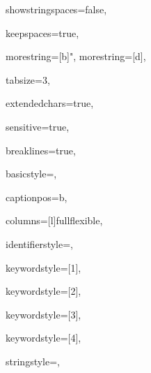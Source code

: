 {%
showstringspaces=false,

keepspaces=true,

morestring=[b]",
morestring=[d],

tabsize=3,

extendedchars=true,

sensitive=true,

breaklines=true,

basicstyle=\ttfamily,

captionpos=b,

columns=[l]fullflexible,


identifierstyle={\ttfamily\color{black}},

keywordstyle=[1]{\ttfamily\color{keywordcolor}},

keywordstyle=[2]{\ttfamily\color{sortcolor}},

keywordstyle=[3]{\ttfamily\color{tacticcolor}},

keywordstyle=[4]{\ttfamily\color{attributecolor}},

stringstyle=\ttfamily,


}
